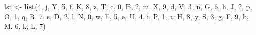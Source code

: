 \documentclass[
]{article}
\newenvironment{Shaded}{\begin{snugshade}}{\end{snugshade}}
\newcommand{\DecValTok}[1]{\textcolor[rgb]{0.00,0.00,0.81}{#1}}
\newcommand{\FunctionTok}[1]{\textcolor[rgb]{0.13,0.29,0.53}{\textbf{#1}}}
\newcommand{\NormalTok}[1]{#1}
\newcommand{\OtherTok}[1]{\textcolor[rgb]{0.56,0.35,0.01}{#1}}
\newcommand{\StringTok}[1]{\textcolor[rgb]{0.31,0.60,0.02}{#1}}
\begin{document}
\begin{Shaded}
\begin{Highlighting}[]
\NormalTok{lst }\OtherTok{\textless{}{-}} \FunctionTok{list}\NormalTok{(}\DecValTok{4}\NormalTok{, }\StringTok{\textquotesingle{}j\textquotesingle{}}\NormalTok{, }\StringTok{\textquotesingle{}Y\textquotesingle{}}\NormalTok{, }\DecValTok{5}\NormalTok{, }\StringTok{\textquotesingle{}f\textquotesingle{}}\NormalTok{, }\StringTok{\textquotesingle{}K\textquotesingle{}}\NormalTok{, }\DecValTok{8}\NormalTok{, }\StringTok{\textquotesingle{}z\textquotesingle{}}\NormalTok{, }\StringTok{\textquotesingle{}T\textquotesingle{}}\NormalTok{, }\StringTok{\textquotesingle{}c\textquotesingle{}}\NormalTok{, }\DecValTok{0}\NormalTok{, }\StringTok{\textquotesingle{}B\textquotesingle{}}\NormalTok{, }\DecValTok{2}\NormalTok{, }\StringTok{\textquotesingle{}m\textquotesingle{}}\NormalTok{, }\StringTok{\textquotesingle{}X\textquotesingle{}}\NormalTok{, }\DecValTok{9}\NormalTok{, }\StringTok{\textquotesingle{}d\textquotesingle{}}\NormalTok{, }\StringTok{\textquotesingle{}V\textquotesingle{}}\NormalTok{, }\DecValTok{3}\NormalTok{, }\StringTok{\textquotesingle{}n\textquotesingle{}}\NormalTok{, }\StringTok{\textquotesingle{}G\textquotesingle{}}\NormalTok{, }\DecValTok{6}\NormalTok{, }\StringTok{\textquotesingle{}h\textquotesingle{}}\NormalTok{, }\StringTok{\textquotesingle{}J\textquotesingle{}}\NormalTok{, }\DecValTok{2}\NormalTok{, }\StringTok{\textquotesingle{}p\textquotesingle{}}\NormalTok{, }\StringTok{\textquotesingle{}O\textquotesingle{}}\NormalTok{, }\DecValTok{1}\NormalTok{, }\StringTok{\textquotesingle{}q\textquotesingle{}}\NormalTok{, }\StringTok{\textquotesingle{}R\textquotesingle{}}\NormalTok{, }\DecValTok{7}\NormalTok{, }\StringTok{\textquotesingle{}s\textquotesingle{}}\NormalTok{, }\StringTok{\textquotesingle{}D\textquotesingle{}}\NormalTok{, }\DecValTok{2}\NormalTok{, }\StringTok{\textquotesingle{}l\textquotesingle{}}\NormalTok{, }\StringTok{\textquotesingle{}N\textquotesingle{}}\NormalTok{, }\DecValTok{0}\NormalTok{, }\StringTok{\textquotesingle{}w\textquotesingle{}}\NormalTok{, }\StringTok{\textquotesingle{}E\textquotesingle{}}\NormalTok{, }\DecValTok{5}\NormalTok{, }\StringTok{\textquotesingle{}e\textquotesingle{}}\NormalTok{, }\StringTok{\textquotesingle{}U\textquotesingle{}}\NormalTok{, }\DecValTok{4}\NormalTok{, }\StringTok{\textquotesingle{}i\textquotesingle{}}\NormalTok{, }\StringTok{\textquotesingle{}P\textquotesingle{}}\NormalTok{, }\DecValTok{1}\NormalTok{, }\StringTok{\textquotesingle{}a\textquotesingle{}}\NormalTok{, }\StringTok{\textquotesingle{}H\textquotesingle{}}\NormalTok{, }\DecValTok{8}\NormalTok{, }\StringTok{\textquotesingle{}y\textquotesingle{}}\NormalTok{, }\StringTok{\textquotesingle{}S\textquotesingle{}}\NormalTok{, }\DecValTok{3}\NormalTok{, }\StringTok{\textquotesingle{}g\textquotesingle{}}\NormalTok{, }\StringTok{\textquotesingle{}F\textquotesingle{}}\NormalTok{, }\DecValTok{9}\NormalTok{, }\StringTok{\textquotesingle{}b\textquotesingle{}}\NormalTok{, }\StringTok{\textquotesingle{}M\textquotesingle{}}\NormalTok{, }\DecValTok{6}\NormalTok{, }\StringTok{\textquotesingle{}k\textquotesingle{}}\NormalTok{, }\StringTok{\textquotesingle{}L\textquotesingle{}}\NormalTok{, }\DecValTok{7}\NormalTok{)}


\end{Highlighting}
\end{Shaded}
\end{document}
